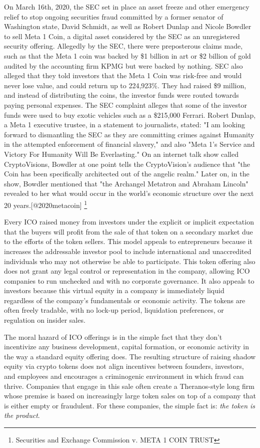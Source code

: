 On March 16th, 2020, the SEC set in place an asset freeze and other emergency
relief to stop ongoing securities fraud committed by a former senator of
Washington state, David Schmidt, as well as Robert Dunlap and Nicole Bowdler to
sell Meta 1 Coin, a digital asset considered by the SEC as an unregistered
security offering. Allegedly by the SEC, there were preposterous claims made,
such as that the Meta 1 coin was backed by \$1 billion in art or \$2 billion of
gold audited by the accounting firm KPMG but were backed by nothing. SEC also
alleged that they told investors that the Meta 1 Coin was risk-free and would
never lose value, and could return up to 224,923\%. They had raised \$9 million, and instead of distributing the coins, the investor funds were routed towards paying personal expenses. The SEC complaint alleges that some of the investor funds were used to buy exotic vehicles such as a \$215,000 Ferrari. Robert Dunlap, a Meta 1 executive trustee, in a statement to journalists, stated: "I am looking forward to dismantling the SEC as they are committing crimes against Humanity in the attempted enforcement of financial slavery," and also "Meta 1's Service and Victory For Humanity Will Be Everlasting." On an internet talk show called CryptoVisions, Bowdler at one point tells the CryptoVision's audience that "the Coin has been specifically architected out of the angelic realm." Later on, in the show, Bowdler mentioned that "the Archangel Metatron and Abraham Lincoln" revealed to her what would occur in the world's economic structure over the next 20 years.[@2020metacoin]
\footnote{Securities and Exchange Commission v. META 1 COIN TRUST}
\cite{2020metacoin}

Every ICO raised money from investors under the explicit or implicit expectation
that the buyers will profit from the sale of that token on a secondary market
due to the efforts of the token sellers. This model appeals to entrepreneurs
because it increases the addressable investor pool to include international and
unaccredited individuals who may not otherwise be able to participate. This
token offering also does not grant any legal control or representation in the
company, allowing ICO companies to run unchecked and with no corporate
governance. It also appeals to investors because this virtual equity in a
company is immediately liquid regardless of the company's fundamentals or
economic activity. The tokens are often freely tradable, with no lock-up period,
liquidation preferences, or regulation on insider sales.

The moral hazard of ICO offerings is in the simple fact that they don't
incentivize any business development, capital formation, or economic activity in
the way a standard equity offering does. The resulting structure of raising
shadow equity via crypto tokens does not align incentives between founders,
investors, and employees and encourages a criminogenic environment in which
fraud can thrive. Companies that engage in this sale often create a
Theranos-style long firm whose premise is based on increasingly large token
sales on top of a company that is either empty or fraudulent. For these
companies, the simple fact is: \textit{the token is the product}.
\cite{momtaz2020entrepreneurial}

